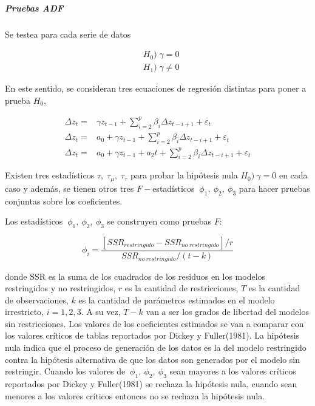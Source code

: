 \documentclass[
  oneside]{article}
\begin{document}
\hypertarget{pruebas-adf}{%
\subparagraph{Pruebas ADF}\label{pruebas-adf}}

Se testea para cada serie de datos

\begin{align*}
    &H_0)\; \gamma = 0\\
    &H_1)\; \gamma \neq 0   
\end{align*}

En este sentido, se consideran tres ecuaciones de regresión distintas
para poner a prueba \(H_0\),

\begin{align}
    \label{eq: modelo_c}
    \Delta z_t=&\gamma z_{t-1} + \sum_{i=2}^p \beta_i \Delta z_{t-i+1} + \varepsilon_t \\
    \label{eq: modelo_b}
    \Delta z_t=&a_0+\gamma z_{t-1} + \sum_{i=2}^p \beta_i \Delta z_{t-i+1} + \varepsilon_t \\
    \label{eq: modelo_a}
    \Delta z_t=&a_0+\gamma z_{t-1} + a_2 t+ \sum_{i=2}^p \beta_i \Delta z_{t-i+1} + \varepsilon_t
\end{align}

Existen tres estadísticos \(\tau,\;\tau_{\mu},\;\tau_{\tau}\) para
probar la hipótesis nula \(H_0)\:\gamma=0\) en cada caso y además, se
tienen otros tres \(F-\)estadísticos \(\:\phi_1,\:\phi_2,\:\phi_3\) para
hacer pruebas conjuntas sobre los coeficientes.

Los estadísticos \(\:\phi_1,\:\phi_2,\:\phi_3\) se construyen como
pruebas \(F\):

\begin{equation*}
    \phi_{i}=\frac{\left[SSR_{restringido}-SSR_{no\:restringido}\right]/r}{SSR_{no\:restringido}/(t-k)}    
\end{equation*}

donde SSR es la suma de los cuadrados de los residuos en los modelos
restringidos y no restringidos, \(r\) es la cantidad de restricciones,
\(T\) es la cantidad de observaciones, \(k\) es la cantidad de
parámetros estimados en el modelo irrestricto, \(i=1,2,3\). A su vez,
\(T-k\) van a ser los grados de libertad del modelos sin restricciones.
Los valores de los coeficientes estimados se van a comparar con los
valores críticos de tablas reportados por Dickey y Fuller(1981). La
hipótesis nula indica que el proceso de generación de los datos es la
del modelo restringido contra la hipótesis alternativa de que los datos
son generados por el modelo sin restringir. Cuando los valores de
\(\:\phi_1,\:\phi_2,\:\phi_3\) sean mayores a los valores críticos
reportados por Dickey y Fuller(1981) se rechaza la hipótesis nula,
cuando sean menores a los valores críticos entonces no se rechaza la
hipótesis nula.
\end{document}
